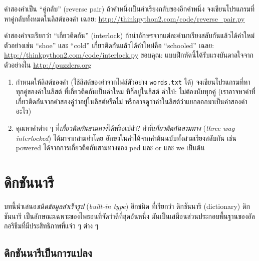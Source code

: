 \begin{exercise}

คำสองคำเป็น ``คู่กลับ'' (reverse pair) ถ้าคำหนึ่งเป็นคำเรียงกลับของอีกคำหนึ่ง
จงเขียนโปรแกรมที่หาคู่กลับทั้งหมดในลิสต์ของคำ
เฉลย: \url{http://thinkpython2.com/code/reverse_pair.py}

\end{exercise}
\vspace{0.5cm}


\begin{exercise}

คำสองคำจะเรียกว่า ``เกี่ยวติดกัน'' (interlock) ถ้านำอักษรจากแต่ละคำมาเรียงสลับกันแล้วได้คำใหม่
ตัวอย่างเช่น ``shoe'' และ ``cold''
เกี่ยวติดกันแล้วได้คำใหม่คือ ``schooled''
เฉลย: \url{http://thinkpython2.com/code/interlock.py}
ขอบคุณ: แบบฝึกหัดนี้ได้รับแรงบันดาลใจจากตัวอย่างใน \url{http://puzzlers.org}

\begin{enumerate}

\item กำหนดให้ลิสต์ของคำ (ใช้ลิสต์ของคำจากไฟล์ตัวอย่าง \texttt{words.txt} ได้) จงเขียนโปรแกรมที่หาทุกคู่ของคำในลิสต์ ที่เกี่ยวติดกันเป็นคำใหม่ ที่ก็อยู่ในลิสต์
คำใบ้: ไม่ต้องนับทุกคู่ (เราอาจหาคำที่เกี่ยวติดกันจากคำสองคู่ว่าอยู่ในลิสต์หรือไม่ 
หรืออาจดูว่าคำในลิสต์ว่าแยกออกมาเป็นคำสองคำอะไร)

\item คุณหาคำต่าง ๆ ที่\textit{เกี่ยวติดกันสามทาง}ได้หรือเปล่า?
คำที่\textit{เกี่ยวติดกันสามทาง} (\textit{three-way interlocked}) ได้มาจากสามคำโดย
อักษรในคำได้จากคำต้นฉบับทั้งสามเรียงสลับกัน เช่น powered ได้จากการเกี่ยวติดกันสามทางของ ped และ or และ we เป็นต้น

\end{enumerate}
\end{exercise}
\vspace{0.5cm}


\chapter{ดิกชันนารี}

บทนี้นำเสนอ\textit{ชนิดข้อมูลสำเร็จรูป} (\textit{built-in type}) อีกชนิด ที่เรียกว่า ดิกชันนารี (dictionary)
ดิกชันนารี เป็นลักษณะเฉพาะของไพธอนที่จัดว่าดีที่สุดอันหนึ่ง
มันเป็นเสมือนส่วนประกอบพื้นฐานของอัลกอริธึมที่มีประสิทธิภาพที่แจ๋ว ๆ ต่าง ๆ

\section{ดิกชันนารีเป็นการแปลง}

